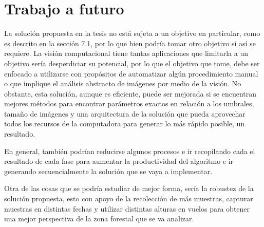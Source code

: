 \section{Trabajo a futuro}
La solución propuesta en la tesis no está sujeta a un objetivo en particular, como es descrito en la sección 7.1, por lo que bien podría tomar otro objetivo si así se requiere. La visión computacional tiene tantas aplicaciones que limitarla a un objetivo sería desperdiciar su potencial, por lo que el objetivo que tome, debe ser enfocado a utilizarse con propósitos de automatizar algún procedimiento manual o que implique el análisis abstracto de imágenes por medio de la visión. No obstante, esta solución, aunque es eficiente, puede ser mejorada si se encuentran mejores métodos para encontrar parámetros exactos en relación a los umbrales, tamaño de imágenes y una arquitectura de la solución que pueda aprovechar todos los recursos de la computadora para generar lo más rápido posible, un resultado.

En general, también podrían reducirse algunos procesos e ir recopilando cada el resultado de cada fase para aumentar la productividad del algoritmo e ir generando secuencialmente la solución que se vaya a implementar.

Otra de las cosas que se podría estudiar de mejor forma, sería la robustez de la solución propuesta, esto con apoyo de la recolección de más muestras, capturar muestras en distintas fechas y  utilizar distintas alturas en vuelos para obtener una mejor perspectiva de la zona forestal que se va analizar.
%
%
